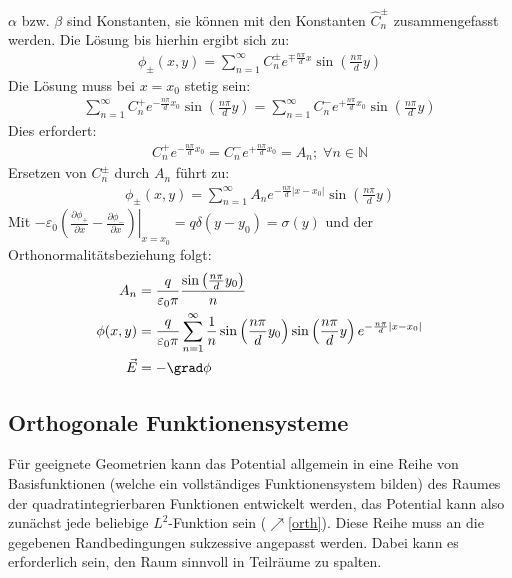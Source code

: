 		   $\alpha$ bzw. $\beta$ sind Konstanten, sie können mit den Konstanten $\hat{C}_n^\pm$ zusammengefasst werden. Die Lösung bis hierhin ergibt sich zu:
		        \begin{equation}\begin{split}
				        \phi_\pm(x,y) = \sum_{n=1}^\infty C_n^\pm e^{\mp\frac{n\pi}{d} x} \sin\left(\frac{n\pi}{d} y\right)
			        \end{split}\end{equation}
		   Die Lösung muss bei $x=x_0$ stetig sein:
		        \begin{equation}\begin{split}
				        \sum_{n=1}^\infty C_n^+ e^{-\frac{n\pi}{d} x_0} \sin\left(\frac{n\pi}{d} y\right) = \sum_{n=1}^\infty C_n^- e^{+\frac{n\pi}{d} x_0} \sin\left(\frac{n\pi}{d} y\right)
			        \end{split}\end{equation}
		   Dies erfordert:
		        \begin{equation}\begin{split}
				        C_n^+ e^{-\frac{n\pi}{d} x_0} = C_n^- e^{+\frac{n\pi}{d} x_0} = A_n; \; \forall n\in\mathbb{N}
			        \end{split}\end{equation}
		   Ersetzen von $C_n^\pm$ durch $A_n$ führt zu:
		        \begin{equation}\begin{split}
				        \phi_\pm(x,y) = \sum_{n=1}^\infty A_n e^{-\frac{n\pi}{d} |x-x_0|} \sin\left(\frac{n\pi}{d} y\right)
			        \end{split}\end{equation}
		   Mit $\left. -\varepsilon_0\left( \frac{\partial \phi_+}{\partial x} -\frac{\partial \phi_-}{\partial x} \right)\right|_{x=x_0} = q\delta(y-y_0)=\sigma(y)$ und der Orthonormalitätsbeziehung folgt:
		        \begin{equation}\begin{split}
				        A_n &= \frac{q}{\varepsilon_0 \pi} \frac{\sin\left(\frac{n\pi}{d}y_0\right)}{n} \\
				        \phi(x,y) &= \frac{q}{\varepsilon_0 \pi}  \sum_{n=1}^\infty \frac{1}{n} \sin\left(\frac{n\pi}{d}y_0\right)  \sin\left(\frac{n\pi}{d}y\right)  e^{-\frac{n\pi}{d} |x-x_0|} \\
				         \vec{E} &= -\grad \phi
			        \end{split}\end{equation}
\subsection{Orthogonale Funktionensysteme}\label{elorth}
Für geeignete Geometrien kann das Potential allgemein in eine Reihe von Basisfunktionen (welche ein vollständiges Funktionensystem bilden) des Raumes der quadratintegrierbaren Funktionen entwickelt werden, das Potential kann also zunächst jede beliebige $L^2$-Funktion sein ($\nearrow$\ref{orth}). Diese Reihe muss an die gegebenen Randbedingungen sukzessive angepasst werden. Dabei kann es erforderlich sein, den Raum sinnvoll in Teilräume zu spalten.
